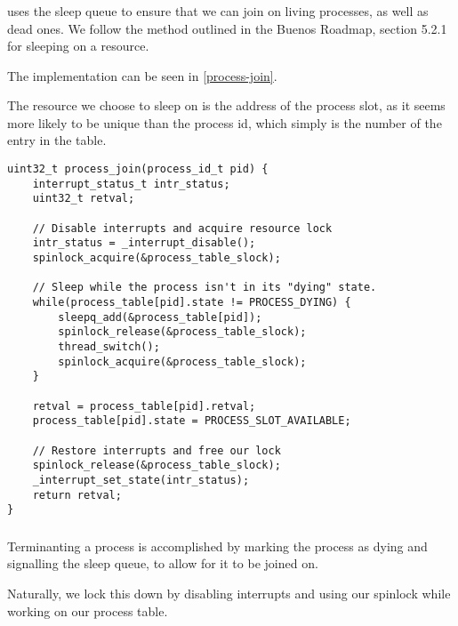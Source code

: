 \subsubsection{}
 uses the sleep queue to ensure that we can join on living
processes, as well as dead ones. We follow the method outlined in the Buenos
Roadmap, section 5.2.1 for sleeping on a resource.

The implementation can be seen in \autoref{process-join}.

The resource we choose to sleep on is the address of the process slot, as it
seems more likely to be unique than the process id, which simply is the number of
the entry in the table.

\begin{lstlisting}
uint32_t process_join(process_id_t pid) {
    interrupt_status_t intr_status;
    uint32_t retval;

    // Disable interrupts and acquire resource lock
    intr_status = _interrupt_disable();
    spinlock_acquire(&process_table_slock);

    // Sleep while the process isn't in its "dying" state.
    while(process_table[pid].state != PROCESS_DYING) {
        sleepq_add(&process_table[pid]);
        spinlock_release(&process_table_slock);
        thread_switch();
        spinlock_acquire(&process_table_slock);
    }

    retval = process_table[pid].retval;
    process_table[pid].state = PROCESS_SLOT_AVAILABLE;

    // Restore interrupts and free our lock
    spinlock_release(&process_table_slock);
    _interrupt_set_state(intr_status);
    return retval;
}
\end{lstlisting}

\subsubsection{}
Terminanting a process is accomplished by marking the process as dying and
signalling the sleep queue, to allow for it to be joined on.

Naturally, we lock this down by disabling interrupts and using our spinlock
while working on our process table.

\FloatBarrier %
